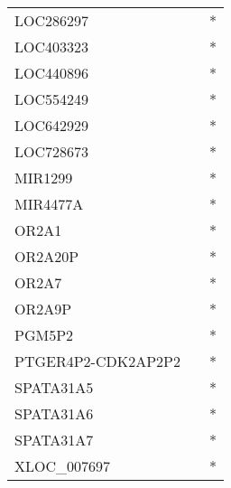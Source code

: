 \begin{longtable}{lcc}
LOC286297          &                &          * \\
LOC403323          &                &          * \\
LOC440896          &                &          * \\
LOC554249          &                &          * \\
LOC642929          &                &          * \\
LOC728673          &                &          * \\
MIR1299            &                &          * \\
MIR4477A           &                &          * \\
OR2A1              &                &          * \\
OR2A20P            &                &          * \\
OR2A7              &                &          * \\
OR2A9P             &                &          * \\
PGM5P2             &                &          * \\
PTGER4P2-CDK2AP2P2 &                &          * \\
SPATA31A5          &                &          * \\
SPATA31A6          &                &          * \\
SPATA31A7          &                &          * \\
XLOC\_007697        &                &          * \\
\end{longtable}

